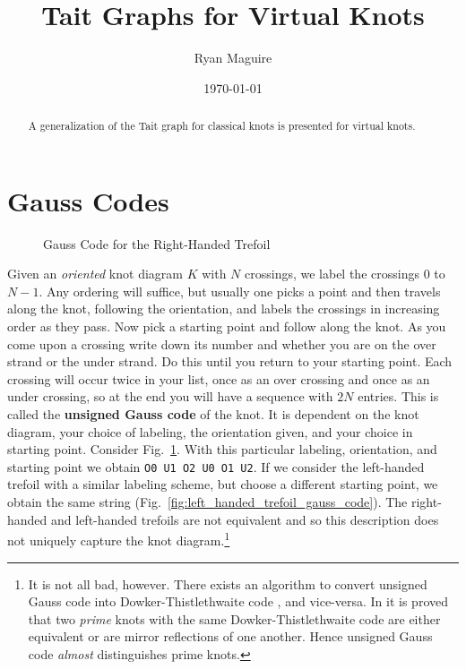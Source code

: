 \documentclass{article}
\title{Tait Graphs for Virtual Knots}
\author{Ryan Maguire}
\date{\today}
\theoremstyle{plain}
\begin{document}
    \maketitle
    \tableofcontents
    \begin{abstract}
        A generalization of the Tait graph for classical knots is presented
        for virtual knots.
    \end{abstract}
    \section{Gauss Codes}
        \begin{figure}
            \centering
            \caption{Gauss Code for the Right-Handed Trefoil}
            \label{fig:right_handed_trefoil_gauss_code}
        \end{figure}
        Given an \textit{oriented} knot diagram $K$ with $N$ crossings, we
        label the crossings $0$ to $N-1$. Any ordering will suffice, but
        usually one picks a point and then travels along the knot, following
        the orientation, and labels the crossings in increasing order as they
        pass. Now pick a starting point and follow along the knot. As you
        come upon a crossing write down its number and whether you are on the
        over strand or the under strand. Do this until you return to your
        starting point. Each crossing will occur twice in your list, once as an
        over crossing and once as an under crossing, so at the end you will
        have a sequence with $2N$ entries. This is called the
        \textbf{unsigned Gauss code} of the knot. It is dependent on the
        knot diagram, your choice of labeling, the orientation given, and your
        choice in starting point. Consider
        Fig.~\ref{fig:right_handed_trefoil_gauss_code}. With this particular
        labeling, orientation, and starting point we obtain
        \texttt{O0 U1 O2 U0 O1 U2}. If we consider the left-handed trefoil with
        a similar labeling scheme, but choose a different starting point, we
        obtain the same string (Fig.~\ref{fig:left_handed_trefoil_gauss_code}).
        The right-handed and left-handed trefoils are
        not equivalent \cite[p.~200-204]{DehnGroupTheoryAndTopology} and so
        this description does not uniquely capture the knot diagram.\footnote{%
            It is not all bad, however. There exists an algorithm to
            convert unsigned Gauss code into Dowker-Thistlethwaite code
            \cite{KatlasDTCode}, and vice-versa. In \cite{DOWKER198319} it is
            proved that two \textit{prime} knots with the same
            Dowker-Thistlethwaite code are either equivalent or are mirror
            reflections of one another. Hence unsigned Gauss code
            \textit{almost} distinguishes prime knots.
        }
\end{document}
